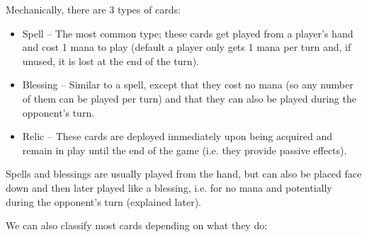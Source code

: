 \documentclass[dvipsnames,parskip,a4paper]{scrartcl}
\begin{document}
Mechanically, there are 3 types of cards:

\begin{itemize}
\item Spell -- The most common type; these cards get played from a player's hand and cost 1 mana to play (default a player only gets 1 mana per turn and, if unused, it is lost at the end of the turn).
\item Blessing -- Similar to a spell, except that they cost no mana (so any number of them can be played per turn) and that they can also be played during the opponent's turn.
\item Relic -- These cards are deployed immediately upon being acquired and remain in play until the end of the game (i.e. they provide passive effects).
\end{itemize}

Spells and blessings are usually played from the hand, but can also be placed face down and then later played like a blessing, i.e. for no mana and potentially during the opponent's turn (explained later).

\vspace{4pt}

We can also classify most cards depending on what they do:
\end{document}
